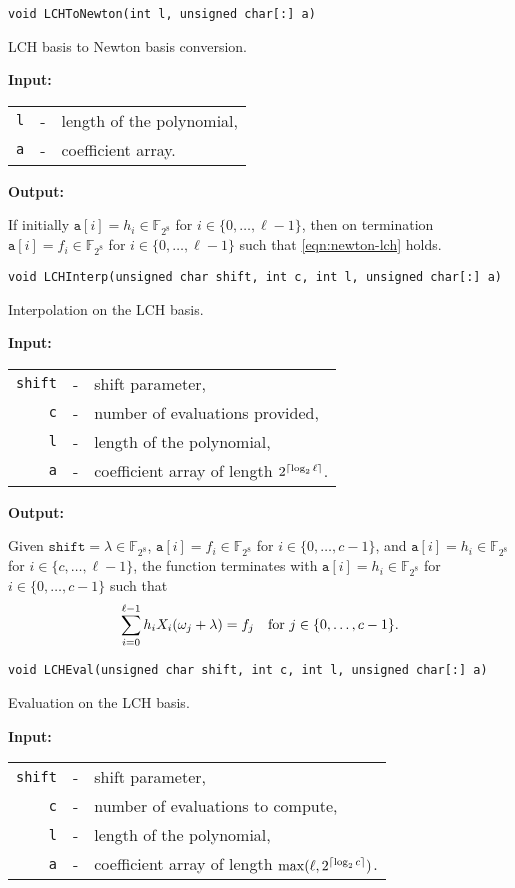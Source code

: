 \documentclass{amsart}
\makeatletter
\newcommand{\ceil}[1]{\left\lceil #1\right\rceil}
\newcommand{\F}{\mathbb{F}}
\newcommand{\Input}{\textbf{Input:}}
\newcommand{\Output}{\textbf{Output:}}
\newcommand{\XtoN}{LCHToNewton}
\newcommand{\XtoL}{LCHEval}
\newcommand{\LtoX}{LCHInterp}
\let\originalleft\left
\let\originalright\right
\renewcommand{\left}{\mathopen{}\mathclose\bgroup\originalleft}
\renewcommand{\right}{\aftergroup\egroup\originalright}
\newenvironment{inputs}{\Input\par\begin{tabular}{@{}rcl}}{\end{tabular}}
\newenvironment{outputs}{\Output\par}{}
\makeatother
\begin{document}
\texttt{void \XtoN(int l, unsigned char[:]\ a)}

LCH basis to Newton basis conversion.

\begin{inputs}
	\texttt{l} & - & length of the polynomial, \\
	\texttt{a} & - & coefficient array.
\end{inputs}

\begin{outputs}
	If initially $\texttt{a}[i]=h_i\in\F_{2^8}$ for $i\in\{0,\dotsc,\ell-1\}$, then
	on termination $\texttt{a}[i]=f_i\in\F_{2^8}$ for $i\in\{0,\dotsc,\ell-1\}$ such
	that \eqref{eqn:newton-lch} holds.
\end{outputs}

\texttt{void \LtoX(unsigned char shift, int c, int l, unsigned char[:]\ a)}

Interpolation on the LCH basis.

\begin{inputs}
	\texttt{shift} & - & shift parameter,                \\
	\texttt{c} & - & number of evaluations provided, \\
	\texttt{l} & - & length of the polynomial,       \\
	\texttt{a} & - & coefficient array of length $2^{\ceil{\log_2\ell}}$.
\end{inputs}

\begin{outputs}
	Given $\texttt{shift}=\lambda\in\F_{2^8}$, $\texttt{a}[i]=f_i\in\F_{2^8}$ for
	$i\in\{0,\dotsc,c-1\}$, and $\texttt{a}[i]=h_i\in\F_{2^8}$ for
	$i\in\{c,\dotsc,\ell-1\}$, the function terminates with
	$\texttt{a}[i]=h_i\in\F_{2^8}$ for $i\in\{0,\dotsc,c-1\}$ such that
	\begin{equation}\label{eqn:lagrange-lch}
		\sum^{\ell-1}_{i=0}
		h_i
		X_i\left(\omega_j+\lambda\right)
		=
		f_j
		\quad
		\text{for $j\in\{0,\dotsc,c-1\}$}.
	\end{equation}
\end{outputs} 

\texttt{void \XtoL(unsigned char shift, int c, int l, unsigned char[:]\ a)}

Evaluation on the LCH basis.

\begin{inputs}
	\texttt{shift} & - & shift parameter,                  \\
	\texttt{c} & - & number of evaluations to compute, \\
	\texttt{l} & - & length of the polynomial,         \\
	\texttt{a} & - & coefficient array of length
	$\max(\ell,2^{\ceil{\log_2c}})$.
\end{inputs}
\end{document}

